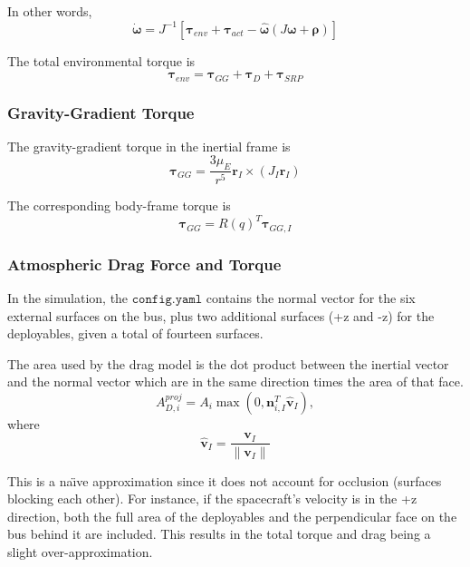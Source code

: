 \documentclass[conference,onecolumn,draftclsnofoot]{IEEEtran}
\begin{document}
In other words,
\begin{equation}
\dot{\boldsymbol{\omega}}
=
J^{-1}
\left[
\boldsymbol{\tau}_{env}
+
\boldsymbol{\tau}_{act}
-
\hat{\boldsymbol{\omega}}\left(J\boldsymbol{\omega}+\boldsymbol{\rho}\right)
\right]
\end{equation}

The total environmental torque is
\begin{equation}
\boldsymbol{\tau}_{env}
=
\boldsymbol{\tau}_{GG}
+
\boldsymbol{\tau}_{D}
+
\boldsymbol{\tau}_{SRP}
\end{equation}



\subsubsection{Gravity-Gradient Torque}

The gravity-gradient torque in the inertial frame is
\begin{equation}
\boldsymbol{\tau}_{GG}
=
\frac{3\mu_E}{r^5}
\mathbf r_I
\times
\left(
J_I\mathbf r_I
\right)
\end{equation}

The corresponding body-frame torque is
\begin{equation}
\boldsymbol{\tau}_{GG}
=
R(q)^T
\boldsymbol{\tau}_{GG,I}
\end{equation}

\subsubsection{Atmospheric Drag Force and Torque}

In the simulation, the $\texttt{config.yaml}$ contains the normal vector for the six external surfaces on the bus, plus two additional surfaces (+z and -z) for the deployables, given a total of fourteen surfaces.

The area used by the drag model is the dot product between the inertial vector and the normal vector which are in the same direction times the area of that face.
\begin{equation}
A_{D,i}^{proj}
=
A_i
\max
\left(
0,
\mathbf n_{i,I}^T
\hat{\mathbf v}_I
\right),
\end{equation}
where
\begin{equation}
\hat{\mathbf v}_I
=
\frac{\mathbf v_I}{\|\mathbf v_I\|}
\end{equation}

This is a na\"{\i}ve approximation since it does not account for occlusion (surfaces blocking each other). For instance, if the spacecraft's velocity is in the +z direction, both the full area of the deployables and the perpendicular face on the bus behind it are included. This results in the total torque and drag being a slight over-approximation.
\end{document}
